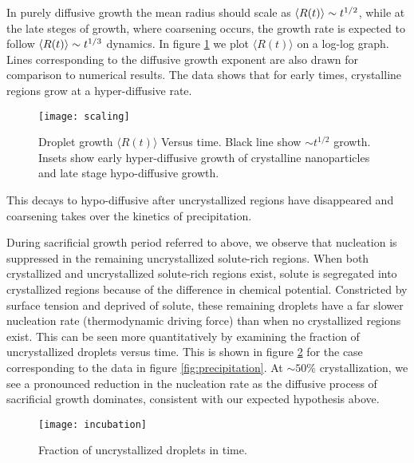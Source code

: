 In purely diffusive growth the mean radius should scale as $\left\langle R(t) \right\rangle \sim
t^{1/2}$, while at the late steges of growth, where coarsening occurs, the
growth rate is expected to follow  $\left\langle R(t) \right\rangle \sim t^{1/3}$ dynamics.  In
figure \ref{fig:scaling} we plot $\langle R(t)\rangle$ on a log-log graph.
Lines corresponding to the diffusive growth exponent are also drawn for
comparison to numerical results. The data shows that for early times,
crystalline regions grow at a hyper-diffusive rate. 
%
\begin{figure}
    \centering
    \texttt{[image: scaling]}
    \caption{
        \label{fig:scaling}
        Droplet growth $\langle R(t) \rangle$ Versus time. Black line show
        $\sim t^{1/2}$ growth. Insets show early hyper-diffusive growth
        of crystalline nanoparticles and late stage hypo-diffusive growth.
    }
\end{figure}
%
\noindent This decays to hypo-diffusive after uncrystallized regions have disappeared and
coarsening takes over the kinetics of precipitation.


During sacrificial growth period referred to above, we observe that nucleation
is suppressed in the remaining uncrystallized solute-rich regions. When both
crystallized and uncrystallized solute-rich regions exist, solute is segregated
into crystallized regions because of the difference in chemical potential.
Constricted by surface tension and deprived of solute, these remaining droplets
have a far slower nucleation rate (thermodynamic driving force) than when no
crystallized regions exist. This can be seen more quantitatively by examining
the fraction of uncrystallized droplets versus time. This is shown in figure
\ref{fig:incubation} for the case corresponding to the data in figure
\ref{fig:precipitation}. At $\sim 50\%$ crystallization, we see a pronounced
reduction in the nucleation rate as the diffusive process of sacrificial growth
dominates, consistent with our expected hypothesis above.
%
\begin{figure}
    \centering
    \texttt{[image: incubation]}
    \caption[Fraction of uncrystallized droplets in time]{
        \label{fig:incubation}
        Fraction of uncrystallized droplets in time.
    }
\end{figure}

